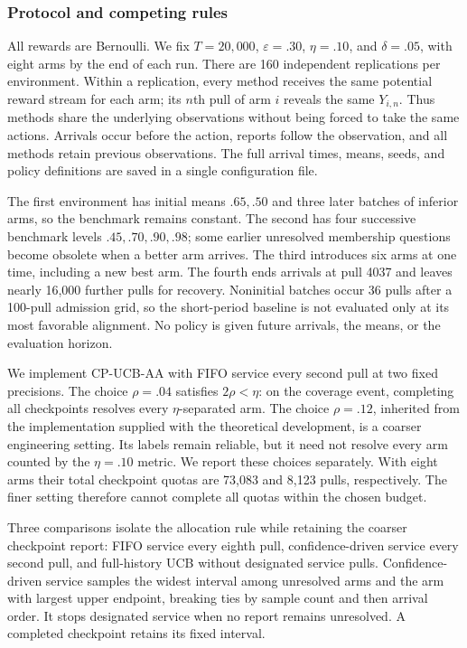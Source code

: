 \documentclass[11pt]{article}
\begin{document}
\subsubsection{Protocol and competing rules}

All rewards are Bernoulli. We fix $T=20{,}000$, $\varepsilon=.30$,
$\eta=.10$, and $\delta=.05$, with eight arms by the end of each run.
There are 160 independent replications per environment. Within a replication,
every method receives the same potential reward stream for each arm; its
$n$th pull of arm $i$ reveals the same $Y_{i,n}$. Thus methods share the
underlying observations without being forced to take the same actions.
Arrivals occur before the action, reports follow the observation, and all
methods retain previous observations. The full arrival times, means, seeds,
and policy definitions are saved in a single configuration file.

The first environment has initial means $.65,.50$ and three later batches of
inferior arms, so the benchmark remains constant. The second has four
successive benchmark levels $.45,.70,.90,.98$; some earlier unresolved
membership questions become obsolete when a better arm arrives. The third
introduces six arms at one time, including a new best arm. The fourth ends
arrivals at pull 4037 and leaves nearly 16,000 further pulls for recovery.
Noninitial batches occur 36 pulls after a 100-pull admission grid, so the
short-period baseline is not evaluated only at its most favorable alignment.
No policy is given future arrivals, the means, or the evaluation horizon.

We implement CP-UCB-AA with FIFO service every second pull at two fixed
precisions. The choice $\rho=.04$ satisfies $2\rho<\eta$: on the coverage
event, completing all checkpoints resolves every $\eta$-separated arm.
The choice $\rho=.12$, inherited from the implementation supplied with the
theoretical development, is a coarser engineering setting. Its labels remain
reliable, but it need not resolve every arm counted by the $\eta=.10$ metric.
We report these choices separately. With eight arms their total checkpoint
quotas are 73,083 and 8,123 pulls, respectively. The finer setting therefore
cannot complete all quotas within the chosen budget.

Three comparisons isolate the allocation rule while retaining the coarser
checkpoint report: FIFO service every eighth pull, confidence-driven service
every second pull, and full-history UCB without designated service pulls.
Confidence-driven service samples the widest interval among unresolved arms
and the arm with largest upper endpoint, breaking ties by sample count and
then arrival order. It stops designated service when no report remains
unresolved. A completed checkpoint retains its fixed interval.
\end{document}
